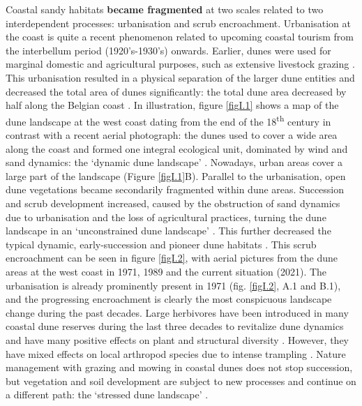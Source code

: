 \documentclass[10pt, twoside]{book} %
\begin{document}
	Coastal sandy habitats \textbf{became fragmented} at two scales related to two interdependent processes: urbanisation and scrub encroachment. Urbanisation at the coast is quite a recent phenomenon related to upcoming coastal tourism from the interbellum period (1920's-1930's) onwards. Earlier, dunes were used for marginal domestic and agricultural purposes, such as extensive livestock grazing \citep{provoost2011}. This urbanisation resulted in a physical separation of the larger dune entities and decreased the total area of dunes significantly: the total dune area decreased by half along the Belgian coast \citep{provoost2004a}. In illustration, figure \ref{figI.1} shows a map of the dune landscape at the west coast dating from the end of the 18\textsuperscript{th} century in contrast with a recent aerial photograph: the dunes used to cover a wide area along the coast and formed one integral ecological unit, dominated by wind and sand dynamics: the `dynamic dune landscape' \citep{provoost2004a}. Nowadays, urban areas cover a large part of the landscape (Figure \ref{figI.1}B). Parallel to the urbanisation, open dune vegetations became secondarily fragmented within dune areas. Succession and scrub development increased, caused by the obstruction of sand dynamics due to urbanisation and the loss of agricultural practices, turning the dune landscape in an `unconstrained dune landscape' \citep{provoost2004a, provoost2020}. This further decreased the typical dynamic, early-succession and pioneer dune habitats \citep{provoost2011}. This scrub encroachment can be seen in figure \ref{figI.2}, with aerial pictures from the dune areas at the west coast in 1971, 1989 and the current situation (2021). The urbanisation is already prominently present in 1971 (fig. \ref{figI.2}, A.1 and B.1), and the progressing encroachment is clearly the most conspicuous landscape change during the past decades. Large herbivores have been introduced in many coastal dune reserves during the last three decades to revitalize dune dynamics and have many positive effects on plant and structural diversity \citep{provoost2004, provoost2020a}. However, they have mixed effects on local arthropod species due to intense trampling \citep{bonte2005, bonte2008, vanklink2015}. Nature management with grazing and mowing in coastal dunes does not stop succession, but vegetation and soil development are subject to new processes and continue on a different path: the `stressed dune landscape' \citep{provoost2004a}.\\
	
\end{document}
